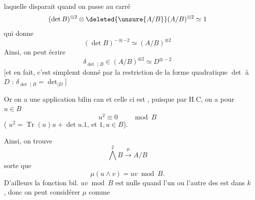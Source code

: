 laquelle disparait quand on passe au carré
\[
(\det B)^{\otimes2}\otimes\deleted{\unsure{A/B}}(A/B)^{\otimes2}\simeq1
\]
qui donne
\[
(\det B)^{-\otimes-2}\simeq(A/B)^{\otimes2}
\]
Ainsi, on peut écrire
\[
\delta_{\det\mid B}\in(A/B)^{\otimes2}\simeq D^{\otimes-2}
\]
[et en fait, c'est simplemt donné par la restriction de la forme quadratique $\det$ à $D$ : $\delta_{\det\mid B}=\det_{\mid D}$]

Or on a une application bilin can
et celle ci est , puisque par H.C, on a pour $u\in B$
\[
u^2\equiv0\qquad\bmod B
\]
( $u^2=\operatorname{Tr}(u)u+\det u.1$, et $1,u\in B$).

Ainsi, on trouve
\[
\bigwedge^2 B\xrightarrow{\mu} A/B
\]
 sorte que
\[
\mu(u\wedge v)=uv\bmod B.
\]
D'ailleurs \deleted{\unsure{$\mu$}} la fonction bil. $uv\bmod B$ est nulle quand l'un ou l'autre des  est dans $k$, donc on peut considérer $\mu$ comme
